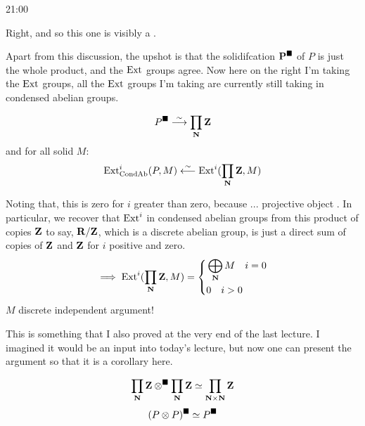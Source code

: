 \begin{unfinished}{21:00}
\begin{sketch}
Right, and so this one is visibly a . 

Apart from this discussion, the upshot is that the solidifcation $\mathbf P^\blacksquare$ of $P$ is just the whole product, and the $\operatorname{Ext}$ groups agree. 
Now here on the right I'm taking the $\operatorname{Ext}$ groups, all the $\operatorname{Ext}$ groups I'm taking are currently still taking in condensed abelian groups.

\begin{corollary}
\begin{align*}
	P^\blacksquare \overset\sim\longrightarrow \prod_\mathbf N \mathbf Z
\end{align*}
and for all solid $M$:
\begin{align*}
	\operatorname{Ext}^i_{\mathrm{Cond}\mathrm{Ab}}(P,M) \overset\sim\longleftarrow \operatorname{Ext}^i(\prod_\mathbf N \mathbf Z, M)
\end{align*}

\end{corollary}

Noting that, this is zero for $i$ greater than zero, because ... projective object . In particular, we recover that $\operatorname{Ext}^i$ in condensed abelian groups from this product of copies $\mathbf Z$ to say, $\mathbf R/\mathbf Z$, which is a discrete abelian group, is just a direct sum of copies of $\mathbf Z$ and $\mathbf Z$ for $i$ positive and zero. 
\begin{align*}
\implies \operatorname{Ext}^i(\prod_\mathbf N \mathbf Z, M) = 
\left\{
    \begin{aligned}
         & \bigoplus_\mathbf N M \quad i = 0 \\
         & 0 \quad i > 0                  
    \end{aligned}
\right.
\end{align*}
$M$ discrete
independent argument!

This is something that I also proved at the very end of the last lecture. 
I imagined it would be an input into today's lecture, but now one can present the argument so that it is a corollary here.

\begin{corollary}
\begin{align*}
\prod_\mathbf N \mathbf Z \otimes^\blacksquare \prod_\mathbf N \mathbf Z \simeq \prod_{\mathbf N \times \mathbf N} \mathbf Z \\
\end{align*}
\begin{align*}
(P \otimes P)^\blacksquare \simeq P^\blacksquare
\end{align*}
\end{corollary}


\end{sketch}
\end{unfinished}
